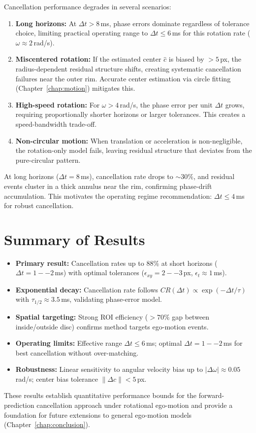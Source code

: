 Cancellation performance degrades in several scenarios:

\begin{enumerate}
\item \textbf{Long horizons:} At $\Delta t > 8$\,ms, phase errors dominate regardless of tolerance choice, limiting practical operating range to $\Delta t \leq 6$\,ms for this rotation rate ($\omega \approx 2$\,rad/s).
\item \textbf{Miscentered rotation:} If the estimated center $\hat c$ is biased by $> 5$\,px, the radius-dependent residual structure shifts, creating systematic cancellation failures near the outer rim. Accurate center estimation via circle fitting (Chapter~\ref{chap:motion}) mitigates this.
\item \textbf{High-speed rotation:} For $\omega > 4$\,rad/s, the phase error per unit $\Delta t$ grows, requiring proportionally shorter horizons or larger tolerances. This creates a speed-bandwidth trade-off.
\item \textbf{Non-circular motion:} When translation or acceleration is non-negligible, the rotation-only model fails, leaving residual structure that deviates from the pure-circular pattern.
\end{enumerate}

At long horizons ($\Delta t=8$\,ms), cancellation rate drops to $\sim 30\%$, and residual events cluster in a thick annulus near the rim, confirming phase-drift accumulation. This motivates the operating regime recommendation: $\Delta t \leq 4$\,ms for robust cancellation.

\section{Summary of Results}

\begin{itemize}
\item \textbf{Primary result:} Cancellation rates up to 88\% at short horizons ($\Delta t=1--2$\,ms) with optimal tolerances ($\epsilon_{xy}=2--3$\,px, $\epsilon_t \approx 1$\,ms).
\item \textbf{Exponential decay:} Cancellation rate follows $CR(\Delta t) \propto \exp(-\Delta t / \tau)$ with $\tau_{1/2} \approx 3.5$\,ms, validating phase-error model.
\item \textbf{Spatial targeting:} Strong ROI efficiency ($> 70\%$ gap between inside/outside disc) confirms method targets ego-motion events.
\item \textbf{Operating limits:} Effective range $\Delta t \leq 6$\,ms; optimal $\Delta t = 1--2$\,ms for best cancellation without over-matching.
\item \textbf{Robustness:} Linear sensitivity to angular velocity bias up to $|\Delta\omega| \approx 0.05$\,rad/s; center bias tolerance $\|\Delta c\| < 5$\,px.
\end{itemize}

These results establish quantitative performance bounds for the forward-prediction cancellation approach under rotational ego-motion and provide a foundation for future extensions to general ego-motion models (Chapter~\ref{chap:conclusion}).
